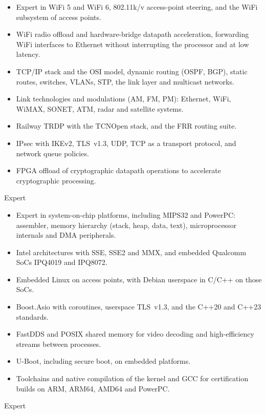 \documentclass[11pt,a4paper]{article}
\newcommand{\cvskill}[2]{%
  \Needspace{5\baselineskip}%
  \noindent{\bfseries\color{cvblue} #1}\hfill{\color{cvaccent} #2}\par
  \nopagebreak
}
\begin{document}
\begin{itemize}
  \item Expert in WiFi 5 and WiFi 6, 802.11k/v access-point steering, and the WiFi subsystem of access points.
  \item WiFi radio offload and hardware-bridge datapath acceleration, forwarding WiFi interfaces to Ethernet without interrupting the processor and at low latency.
  \item TCP/IP stack and the OSI model, dynamic routing (OSPF, BGP), static routes, switches, VLANs, STP, the link layer and multicast networks.
  \item Link technologies and modulations (AM, FM, PM): Ethernet, WiFi, WiMAX, SONET, ATM, radar and satellite systems.
  \item Railway TRDP with the TCNOpen stack, and the FRR routing suite.
  \item IPsec with IKEv2, TLS~v1.3, UDP, TCP as a transport protocol, and network queue policies.
  \item FPGA offload of cryptographic datapath operations to accelerate cryptographic processing.
\end{itemize}

\cvskill{SoC and embedded}{Expert}

\begin{itemize}
  \item Expert in system-on-chip platforms, including MIPS32 and PowerPC: assembler, memory hierarchy (stack, heap, data, text), microprocessor internals and DMA peripherals.
  \item Intel architectures with SSE, SSE2 and MMX, and embedded Qualcomm SoCs IPQ4019 and IPQ8072.
  \item Embedded Linux on access points, with Debian userspace in C/C++ on those SoCs.
  \item Boost.Asio with coroutines, userspace TLS~v1.3, and the C++20 and C++23 standards.
  \item FastDDS and POSIX shared memory for video decoding and high-efficiency streams between processes.
  \item U-Boot, including secure boot, on embedded platforms.
  \item Toolchains and native compilation of the kernel and GCC for certification builds on ARM, ARM64, AMD64 and PowerPC.
\end{itemize}

\cvskill{Linux kernel}{Expert}
\end{document}
